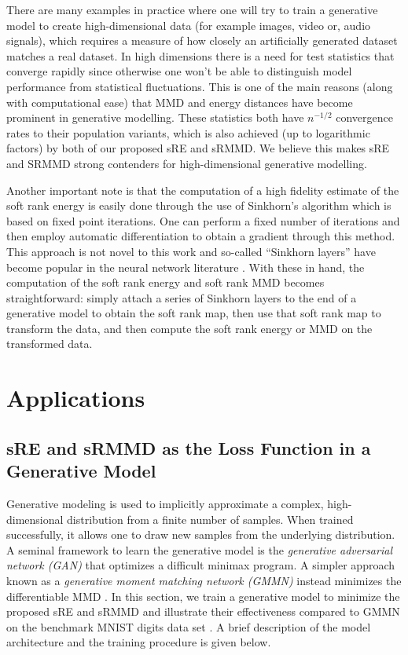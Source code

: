 \documentclass{article}
\theoremstyle{definition}
\begin{document}
There are many examples in practice where one will try to train a generative model to create high-dimensional data (for example images, video or, audio signals), which requires a measure of how closely an artificially generated dataset matches a real dataset. In high dimensions there is a need for test statistics that converge rapidly since otherwise one won't be able to distinguish model performance from statistical fluctuations. This is one of the main reasons (along with computational ease) that MMD and energy distances have become prominent in generative modelling. These statistics both have $n^{-1/2}$ convergence rates to their population variants, which is also achieved (up to logarithmic factors) by both of our proposed sRE and sRMMD.  We believe this makes sRE and SRMMD strong contenders for high-dimensional generative modelling.

Another important note is that the computation of a high fidelity estimate of the soft rank energy is easily done through the use of Sinkhorn's algorithm \cite{cuturi2013sinkhorn} which is based on fixed point iterations. One can perform a fixed number of iterations and then employ automatic differentiation \cite{paszke2017automatic} to obtain a gradient through this method. This approach is not novel to this work and so-called ``Sinkhorn layers''  have become popular in the neural network literature \cite{adams2011ranking,emami2018learning, feydy2019interpolating}. With these in hand, the computation of the soft rank energy and soft rank MMD becomes straightforward:  simply attach a series of Sinkhorn layers to the end of a generative model to obtain the soft rank map, then use that soft rank map to transform the data, and then compute the soft rank energy or MMD on the transformed data. 

\section{Applications}
\label{sec:applications}
\subsection{sRE and sRMMD as the Loss Function in a Generative Model}\label{sec:mnist}
Generative modeling is used to implicitly approximate a complex, high-dimensional distribution from a finite number of samples. When trained successfully, it allows one to draw new samples from the underlying distribution. A seminal framework  to learn the generative model is the \emph{generative adversarial network (GAN)} \cite{goodfellow2014generative} that optimizes a difficult minimax program. A simpler approach known as a \emph{generative moment matching network (GMMN)} \cite{li2015generative} instead minimizes the differentiable MMD \cite{gretton2012kernel}. In this section,  we train a generative model to minimize the proposed sRE and sRMMD and illustrate their effectiveness compared to GMMN on the benchmark MNIST digits data set \cite{lecun1998gradient}. A brief description of the model architecture and the training procedure is given below.
\end{document}
